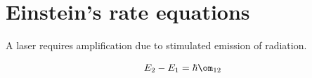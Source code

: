\documentclass[a4paper, 11pt, normalem]{report}
\begin{document}
\chapter{Einstein's rate equations}
A laser requires amplification due to stimulated emission of radiation.
\begin{multicols}{2}
\begin{figure}[H]
    \centering
\end{figure}
\begin{align}
    E_2 - E_1 = \hbar\om_{12}
\end{align}
\end{multicols}
\end{document}
